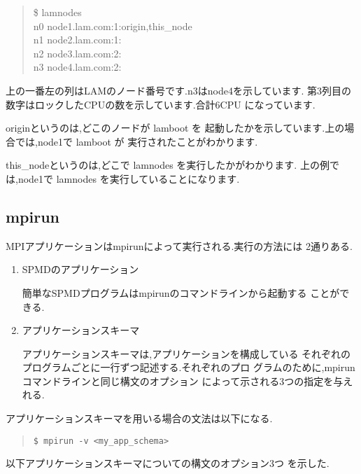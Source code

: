 \documentclass[a4paper,titlepage]{jreport}
\begin{document}
\begin{quote}
\begin{screen}
\$ lamnodes \\
n0 node1.lam.com:1:origin,this\_node \\
n1 node2.lam.com:1: \\
n2 node3.lam.com:2: \\
n3 node4.lam.com:2:
\end{screen}
\end{quote}

上の一番左の列はLAMのノード番号です.n3はnode4を示しています.
第3列目の数字はロックしたCPUの数を示しています.合計6CPU
になっています.

originというのは,どこのノードが lamboot を
起動したかを示しています.上の場合では,node1で lamboot が
実行されたことがわかります.

this\_nodeというのは,どこで lamnodes を実行したかがわかります.
上の例では,node1で lamnodes を実行していることになります.

\subsection{mpirun}
MPIアプリケーションはmpirunによって実行される.実行の方法には
2通りある.

\begin{enumerate}
\item SPMDのアプリケーション

      簡単なSPMDプログラムはmpirunのコマンドラインから起動する
      ことができる.

\item アプリケーションスキーマ

      アプリケーションスキーマは,アプリケーションを構成している
      それぞれのプログラムごとに一行ずつ記述する.それぞれのプロ
      グラムのために,mpirunコマンドラインと同じ構文のオプション
      によって示される3つの指定を与えれる.
\end{enumerate}

アプリケーションスキーマを用いる場合の文法は以下になる.

\begin{quote}
\begin{screen}
\begin{verbatim}
$ mpirun -v <my_app_schema>
\end{verbatim}
\end{screen}
\end{quote}

以下アプリケーションスキーマについての構文のオプション3つ
を示した.
\end{document}
